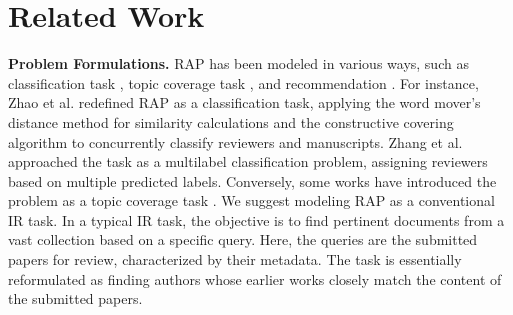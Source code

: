 \section{Related Work}

\textbf{Problem Formulations.}
RAP has been modeled in various ways, such as classification task \cite{Zhao2018paperreviewerrecommnedation,Zhang2020multilabel}, topic coverage task \cite{kou2015weighted}, and recommendation \cite{DBLP:journals/corr/abs-0906-4044,peng2017time}. For instance, Zhao et al. \cite{Zhao2018paperreviewerrecommnedation} redefined RAP as a classification task, applying the word mover’s distance method for similarity calculations and the constructive covering algorithm to concurrently classify reviewers and manuscripts. Zhang et al. \cite{Zhang2020multilabel} approached the task as a multilabel classification problem, assigning reviewers based on multiple predicted labels. Conversely, some works have introduced the problem as a topic coverage task \cite{kou2015weighted}.
We suggest modeling RAP as a conventional IR task. In a typical IR task, the objective is to find pertinent documents from a vast collection based on a specific query. Here, the queries are the submitted papers for review, characterized by their metadata. %
The task is essentially reformulated as finding authors whose earlier works closely match the content of the submitted papers.

